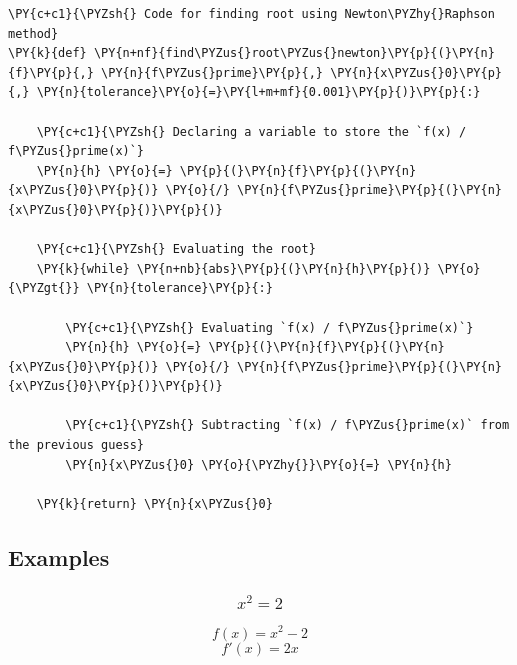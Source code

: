     \begin{tcolorbox}[breakable, size=fbox, boxrule=1pt, pad at break*=1mm,colback=cellbackground, colframe=cellborder]
\begin{Verbatim}[commandchars=\\\{\}]
\PY{c+c1}{\PYZsh{} Code for finding root using Newton\PYZhy{}Raphson method}
\PY{k}{def} \PY{n+nf}{find\PYZus{}root\PYZus{}newton}\PY{p}{(}\PY{n}{f}\PY{p}{,} \PY{n}{f\PYZus{}prime}\PY{p}{,} \PY{n}{x\PYZus{}0}\PY{p}{,} \PY{n}{tolerance}\PY{o}{=}\PY{l+m+mf}{0.001}\PY{p}{)}\PY{p}{:}

    \PY{c+c1}{\PYZsh{} Declaring a variable to store the `f(x) / f\PYZus{}prime(x)`}
    \PY{n}{h} \PY{o}{=} \PY{p}{(}\PY{n}{f}\PY{p}{(}\PY{n}{x\PYZus{}0}\PY{p}{)} \PY{o}{/} \PY{n}{f\PYZus{}prime}\PY{p}{(}\PY{n}{x\PYZus{}0}\PY{p}{)}\PY{p}{)}

    \PY{c+c1}{\PYZsh{} Evaluating the root}
    \PY{k}{while} \PY{n+nb}{abs}\PY{p}{(}\PY{n}{h}\PY{p}{)} \PY{o}{\PYZgt{}} \PY{n}{tolerance}\PY{p}{:}

        \PY{c+c1}{\PYZsh{} Evaluating `f(x) / f\PYZus{}prime(x)`}
        \PY{n}{h} \PY{o}{=} \PY{p}{(}\PY{n}{f}\PY{p}{(}\PY{n}{x\PYZus{}0}\PY{p}{)} \PY{o}{/} \PY{n}{f\PYZus{}prime}\PY{p}{(}\PY{n}{x\PYZus{}0}\PY{p}{)}\PY{p}{)}

        \PY{c+c1}{\PYZsh{} Subtracting `f(x) / f\PYZus{}prime(x)` from the previous guess}
        \PY{n}{x\PYZus{}0} \PY{o}{\PYZhy{}}\PY{o}{=} \PY{n}{h}

    \PY{k}{return} \PY{n}{x\PYZus{}0}
\end{Verbatim}
\end{tcolorbox}

    \hypertarget{examples}{%
\subsection{Examples}\label{examples}}

    \hypertarget{x2-2}{%
\subsubsection{\texorpdfstring{\[x^2 = 2\]}{x\^{}2 = 2}}\label{x2-2}}

\[f(x) = x^2 - 2\] \[f'(x) = 2x\]

